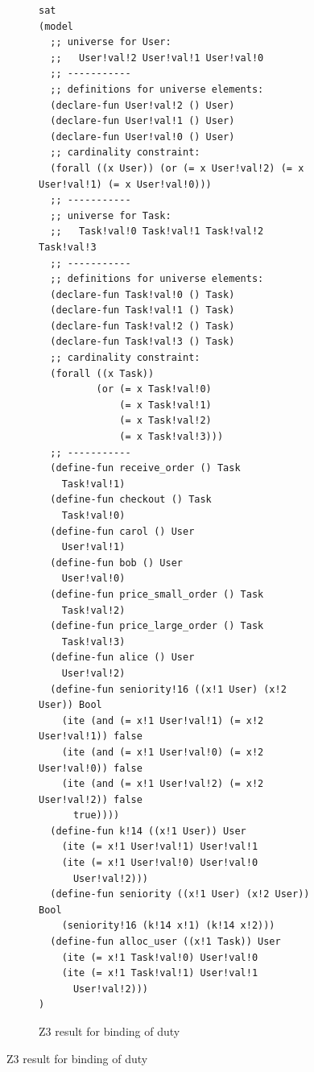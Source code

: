 \documentclass[a4paper]{report}
\begin{document}
\begin{figure}[H]
\ContinuedFloat
\begin{subfigure}{\textwidth}
\begin{lstlisting}[frame=single]
sat
(model 
  ;; universe for User:
  ;;   User!val!2 User!val!1 User!val!0 
  ;; -----------
  ;; definitions for universe elements:
  (declare-fun User!val!2 () User)
  (declare-fun User!val!1 () User)
  (declare-fun User!val!0 () User)
  ;; cardinality constraint:
  (forall ((x User)) (or (= x User!val!2) (= x User!val!1) (= x User!val!0)))
  ;; -----------
  ;; universe for Task:
  ;;   Task!val!0 Task!val!1 Task!val!2 Task!val!3 
  ;; -----------
  ;; definitions for universe elements:
  (declare-fun Task!val!0 () Task)
  (declare-fun Task!val!1 () Task)
  (declare-fun Task!val!2 () Task)
  (declare-fun Task!val!3 () Task)
  ;; cardinality constraint:
  (forall ((x Task))
          (or (= x Task!val!0)
              (= x Task!val!1)
              (= x Task!val!2)
              (= x Task!val!3)))
  ;; -----------
  (define-fun receive_order () Task
    Task!val!1)
  (define-fun checkout () Task
    Task!val!0)
  (define-fun carol () User
    User!val!1)
  (define-fun bob () User
    User!val!0)
  (define-fun price_small_order () Task
    Task!val!2)
  (define-fun price_large_order () Task
    Task!val!3)
  (define-fun alice () User
    User!val!2)
  (define-fun seniority!16 ((x!1 User) (x!2 User)) Bool
    (ite (and (= x!1 User!val!1) (= x!2 User!val!1)) false
    (ite (and (= x!1 User!val!0) (= x!2 User!val!0)) false
    (ite (and (= x!1 User!val!2) (= x!2 User!val!2)) false
      true))))
  (define-fun k!14 ((x!1 User)) User
    (ite (= x!1 User!val!1) User!val!1
    (ite (= x!1 User!val!0) User!val!0
      User!val!2)))
  (define-fun seniority ((x!1 User) (x!2 User)) Bool
    (seniority!16 (k!14 x!1) (k!14 x!2)))
  (define-fun alloc_user ((x!1 Task)) User
    (ite (= x!1 Task!val!0) User!val!0
    (ite (= x!1 Task!val!1) User!val!1
      User!val!2)))
)
\end{lstlisting}
\caption{Z3 result for binding of duty}
\label{fig:Z3 result for binding of duty}
\end{subfigure}
\end{figure}
\end{document}
